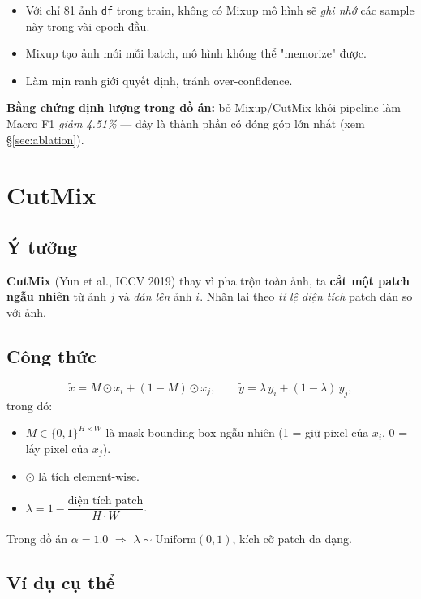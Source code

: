 \documentclass[11pt,a4paper]{article}
\begin{document}
\begin{itemize}[leftmargin=*]
  \item Với chỉ 81 ảnh \texttt{df} trong train, không có Mixup mô hình sẽ \textit{ghi nhớ} các sample này trong vài epoch đầu.
  \item Mixup tạo ảnh mới mỗi batch, mô hình không thể "memorize" được.
  \item Làm mịn ranh giới quyết định, tránh over-confidence.
\end{itemize}

\textbf{Bằng chứng định lượng trong đồ án:} bỏ Mixup/CutMix khỏi pipeline làm Macro F1 \textit{giảm 4.51\%} --- đây là thành phần có đóng góp lớn nhất (xem \S\ref{sec:ablation}).

\section{CutMix}

\subsection{Ý tưởng}

\textbf{CutMix} (Yun et al., ICCV 2019) thay vì pha trộn toàn ảnh, ta \textbf{cắt một patch ngẫu nhiên} từ ảnh $j$ và \textit{dán lên} ảnh $i$. Nhãn lai theo \textit{tỉ lệ diện tích} patch dán so với ảnh.

\subsection{Công thức}

\[
  \tilde{x} = M \odot x_i + (1 - M) \odot x_j, \qquad
  \tilde{y} = \lambda \, y_i + (1-\lambda) \, y_j,
\]
trong đó:
\begin{itemize}[leftmargin=*]
  \item $M \in \{0,1\}^{H \times W}$ là mask bounding box ngẫu nhiên (1 = giữ pixel của $x_i$, 0 = lấy pixel của $x_j$).
  \item $\odot$ là tích element-wise.
  \item $\lambda = 1 - \dfrac{\text{diện tích patch}}{H \cdot W}$.
\end{itemize}

Trong đồ án $\alpha = 1.0$ $\Rightarrow$ $\lambda \sim \mathrm{Uniform}(0, 1)$, kích cỡ patch đa dạng.

\subsection{Ví dụ cụ thể}
\end{document}
